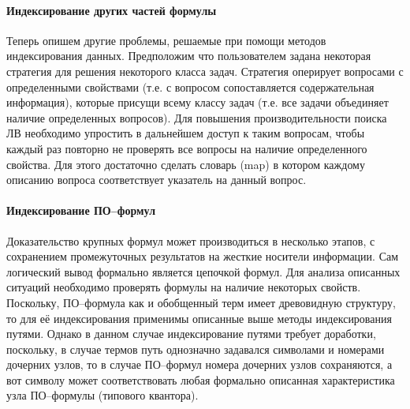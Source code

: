 \paragraph{Индексирование других частей формулы}
Теперь опишем другие проблемы, решаемые при помощи методов индексирования данных. Предположим что пользователем задана некоторая стратегия для решения некоторого класса задач. Стратегия оперирует вопросами с определенными свойствами (т.е. с вопросом сопоставляется содержательная информация), которые присущи всему классу задач (т.е. все задачи объединяет наличие определенных вопросов). Для повышения производительности поиска ЛВ необходимо упростить в дальнейшем доступ к таким вопросам, чтобы каждый раз повторно не проверять все вопросы на наличие определенного свойства. Для этого достаточно сделать словарь (map) в котором каждому описанию вопроса соответствует указатель на данный вопрос. %


\paragraph{Индексирование ПО--формул} Доказательство крупных формул может производиться в несколько этапов, с сохранением промежуточных результатов на жесткие носители информации. Сам логический вывод формально является цепочкой формул. Для анализа описанных ситуаций необходимо проверять формулы на наличие некоторых свойств. Поскольку, ПО--формула как и обобщенный терм имеет древовидную структуру, то для её индексирования применимы описанные выше методы индексирования путями. Однако в данном случае индексирование путями требует доработки, поскольку, в случае термов путь однозначно задавался символами и номерами дочерних узлов, то в случае ПО--формул номера дочерних узлов сохраняются, а вот символу может соответствовать любая формально описанная характеристика узла ПО--формулы (типового квантора). %



